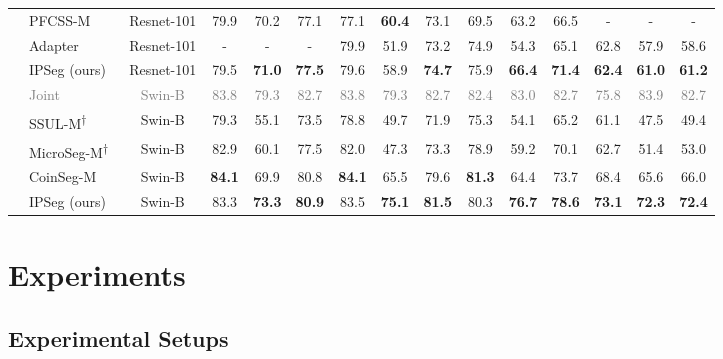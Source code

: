 \begin{table*}[t]
{\begin{tabular}{c|l|c||ccc|ccc|ccc|ccc}
    & PFCSS-M~\citep{PFCSS_lin2023preparing} & Resnet-101 & 79.9 & 70.2 & 77.1 & 77.1 & \textbf{60.4} & 73.1 & 69.5 & 63.2 & 66.5 & - & - & -\\
    & Adapter~\citep{adapter_zhu2024adaptive} & Resnet-101 & - & - & - & 79.9 & 51.9 & 73.2 & 74.9 & 54.3 & 65.1 & 62.8 & 57.9 & 58.6 \\
    & IPSeg (ours) & Resnet-101 & 79.5 & \textbf{71.0} & \textbf{77.5} & 79.6 & 58.9 & \textbf{74.7} & 75.9 & \textbf{66.4} & \textbf{71.4} & \textbf{62.4} & \textbf{61.0} & \textbf{61.2}\\
    \cmidrule{2-15}
    & \textcolor{gray}{Joint} & \textcolor{gray}{Swin-B} & \textcolor{gray}{83.8} & \textcolor{gray}{79.3} & \textcolor{gray}{82.7} & \textcolor{gray}{83.8} & \textcolor{gray}{79.3} & \textcolor{gray}{82.7} & \textcolor{gray}{82.4} & \textcolor{gray}{83.0} & \textcolor{gray}{82.7} & \textcolor{gray}{75.8} & \textcolor{gray}{83.9} & \textcolor{gray}{82.7}\\
    & SSUL-M\textsuperscript{†}~\citep{SSUL_cha2021ssul} & Swin-B & 79.3 & 55.1 & 73.5 & 78.8 & 49.7 & 71.9 & 75.3 & 54.1 & 65.2 & 61.1 & 47.5 & 49.4\\
    & MicroSeg-M\textsuperscript{†}~\citep{microseg_zhang2022mining} & Swin-B & 82.9 & 60.1 & 77.5 & 82.0 & 47.3 & 73.3 & 78.9 & 59.2 & 70.1 & 62.7 & 51.4 & 53.0\\
    & CoinSeg-M~\citep{coinseg_zhang2023coinseg} & Swin-B & \textbf{84.1} & 69.9 & 80.8 & \textbf{84.1} & 65.5 & 79.6 & \textbf{81.3} & 64.4 & 73.7 & 68.4 & 65.6 & 66.0\\
    & IPSeg (ours) & Swin-B & 83.3 & \textbf{73.3} & \textbf{80.9} & 83.5 & \textbf{75.1} & \textbf{81.5} & 80.3 & \textbf{76.7} & \textbf{78.6} & \textbf{73.1} & \textbf{72.3} & \textbf{72.4}\\
    \bottomrule
    \end{tabular}
    }
    \label{tab:voc_res}
\end{table*}


\section{Experiments}
\label{sec:Experiments}

\subsection{Experimental Setups}
\label{sec4-1:exp_setup}

